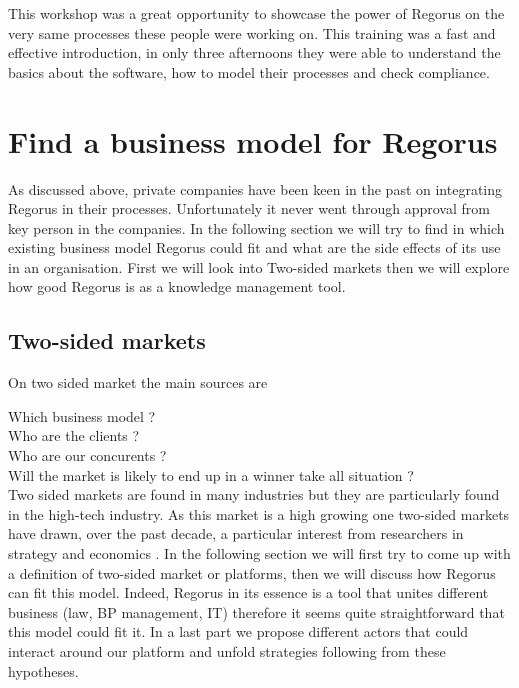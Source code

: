 \documentclass[10pt]{report}
\begin{document}
This workshop was a great opportunity to showcase the power of Regorus on the very same processes these people were working on. This training was a fast and effective introduction, in only three afternoons they were able to understand the basics about the software, how to model their processes and check compliance.

\section{Find a business model for Regorus}

As discussed above, private companies have been keen in the past on integrating Regorus in their processes. Unfortunately it never went through approval from key person in the companies. In the following section we will try to find in which existing business model Regorus could fit and what are the side effects of its use in an organisation. First we will look into Two-sided markets then we will explore how good Regorus is as a knowledge management tool.

\subsection{Two-sided markets}
On two sided market the main sources are \autocite{ParkerA05} \autocite{eisenmann2006strategies} \autocite{rochet2003platform} \autocite{Hagiu2011} \autocite{economides2006}

Which business model ?\\
Who are the clients ?\\
Who are our concurents ?\\

Will the market is likely to end up in a winner take all situation ?\\

Two sided markets are found in many industries but they are particularly found in the high-tech industry. As this market is a high growing one two-sided markets have drawn, over the past decade, a particular interest from researchers in strategy and economics \autocite{Hagiu2011}. In the following section we will first try to come up with a definition of two-sided market or platforms, then we will discuss how Regorus can fit this model. Indeed, Regorus in its essence is a tool that unites different business (law, BP management, IT) therefore it seems quite straightforward that this model could fit it. In a last part we propose different actors that could interact around our platform and unfold strategies following from these hypotheses.
\end{document}
